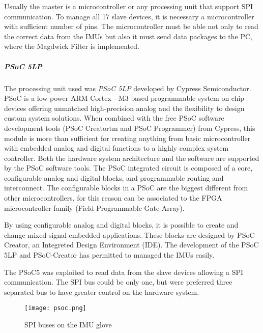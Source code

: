 Usually the master is a microcontroller  or any processing unit that support SPI communication. To manage all 17 slave devices,  it is necessary a microcontroller with sufficient number of pins. The microcontroller must be able not only to read the correct data from the IMUs but also it must send  data packages to the PC, where the Magdwick Filter is implemented.   \\
\newline

\subparagraph{PSoC 5LP}

\noindent The processing unit used was \textit{PSoC 5LP} developed by  Cypress Semiconductor. PSoC is a low power  ARM \textsuperscript \textregistered Cortex - M3 based programmable system on chip devices offering unmatched high-precision analog and the flexibility to design custom system solutions. When combined with the free PSoC software development tools (PSoC Creatortm and
PSoC Programmer) from Cypress, this module is more than sufficient for creating anything from basic microcontroller with embedded analog and digital functions to a highly complex system controller. Both the hardware system architecture and the software are supported by the PSoC
software tools. 
The PSoC integrated circuit is composed of a core, configurable analog and digital blocks, and programmable routing and interconnect. The configurable blocks in a PSoC are the biggest different from other microcontrollers, for this reason can be associated to the FPGA microcontroller family (Field-Programmable Gate Array). 

By using configurable analog and digital blocks, it is possible to  create and change mixed-signal embedded applications. These blocks are designed by PSoC-Creator, an Integreted Design Environment (IDE).  
The development of the PSoC 5LP  and PSoC-Creator has permitted to managed  the IMUs easily. 

The PSoC5 was exploited to read data from the slave devices allowing a SPI communication. The SPI bus could be only one, but were preferred three separated bus to have greater control on the hardware system. 
\begin{figure}[h]
\centering
\texttt{[image: psoc.png]}
\caption{SPI buses on the IMU glove}
\label{fig:spibuses}
\end{figure}

